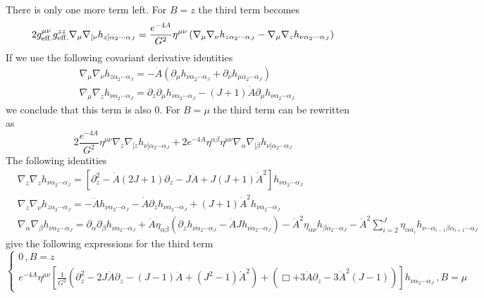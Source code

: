 \documentclass[a4paper,12pt]{article}
\begin{document}
There is only one more term left. For $B = z$ the third term becomes
\begin{equation}
2 g^{\mu \nu}_{\rm{eff.}} g^{zz}_{\rm{eff.}} \nabla_\mu \nabla_{[\nu}h_{z] \alpha_2 \cdots \alpha_J} = \frac{e^{-4A}}{G^2} \eta^{\mu \nu} \left( \nabla_\mu \nabla_\nu h_{z \alpha_2 \cdots \alpha_J} -  \nabla_\mu \nabla_z h_{\nu \alpha_2 \cdots \alpha_J}  \right)
\end{equation}
If we use the following covariant derivative identities
\begin{align}
&\nabla_\mu \nabla_\nu h_{z \alpha_2 \cdots \alpha_J} = -\dot{A} \left( \partial_\mu h_{\nu \alpha_2 \cdots \alpha_J} + \partial_\nu h_{\mu \alpha_2 \cdots \alpha_J} \right) \\
&\nabla_\mu \nabla_z h_{\nu \alpha_2 \cdots \alpha_J} = \partial_z \partial_\mu h_{\nu \alpha_2 \cdots \alpha_J} - \left(J+1\right) \dot{A} \partial_\mu h_{\nu \alpha_2 \cdots \alpha_J}
\end{align}
we conclude that this term is also 0. For $B = \mu$ the third term can be rewritten as
\begin{equation}
2 \frac{e^{-4A}}{G^2} \eta^{\mu \nu} \nabla_{z} \nabla_{[z} h_{\nu] \alpha_2 \cdots \alpha_J} + 2 e^{-4A} \eta^{\alpha \beta} \eta^{\mu \nu} \nabla_{\alpha} \nabla_{[\beta} h_{\nu] \alpha_2 \cdots \alpha_J}
\end{equation}
The following identities
\begin{align}
&\nabla_z \nabla_z h_{\nu \alpha_2 \cdots \alpha_J} = \left[ \partial_z^2 - \dot{A} \left(2 J+1\right) \partial_z - J \ddot{A} + J \left(J+1\right) {\dot{A}}^2 \right] h_{\nu \alpha_2 \cdots \alpha_J} \\
&\nabla_z \nabla_\nu h_{z \alpha_2 \cdots \alpha_J} = - \ddot{A} h_{\nu \alpha_2 \cdots \alpha_J} - \dot{A} \partial_z h_{\nu \alpha_2 \cdots \alpha_J} + \left(J+1\right){\dot{A}}^2 h_{\nu \alpha_2 \cdots \alpha_J} \\
& \nabla_\alpha \nabla_\beta h_{\nu \alpha_2 \cdots \alpha_J} = \partial_\alpha \partial_\beta h_{\nu \alpha_2 \cdots \alpha_J} + \dot{A} \eta_{\alpha \beta} \left( \partial_z h_{\nu \alpha_2 \cdots \alpha_J} - \dot{A} J h_{\nu \alpha_2 \cdots \alpha_J}\right) - {\dot{A}}^2 \eta_{\alpha \nu} h_{\beta \alpha_2 \cdots \alpha_J} - {\dot{A}}^2 \sum_{i=2}^J \eta_{\alpha \alpha_i} h_{\nu \cdots \alpha_{i-1} \beta \alpha_{i+1} \cdots \alpha_J}
\end{align}
give the following expressions for the third term
\begin{equation}
\begin{cases}
0 \, ,B = z \\
e^{-4A} \eta^{\mu \nu} \left[\frac{1}{G^2}\left(\partial_z^2 - 2 J \dot{A} \partial_z - \left(J-1\right) \ddot{A} + \left(J^2-1\right) {\dot{A}}^2 \right)+ \left( \Box + 3\dot{A} \partial_z - 3 {\dot{A}}^2 \left(J-1\right) \right)  \right]h_{\nu \alpha_2 \cdots \alpha_J} \, , B = \mu
\end{cases}
\end{equation}
\end{document}
